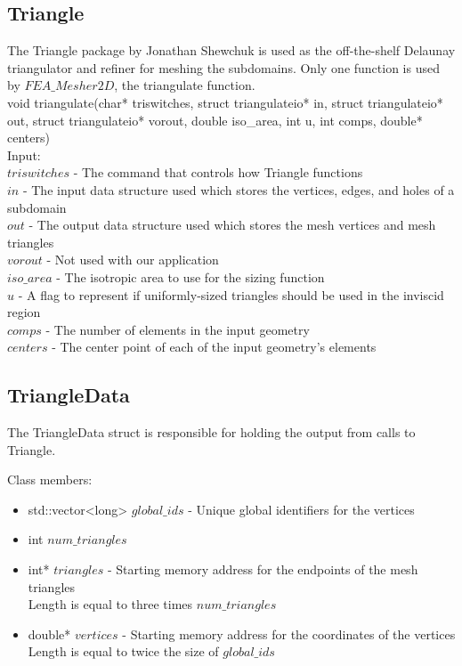 \documentclass[manuscript, screen]{acmart}
\begin{document}
\subsection{Triangle}
The Triangle package by Jonathan Shewchuk is used as the off-the-shelf Delaunay triangulator and refiner for meshing the subdomains. Only one function is used by $FEA\_Mesher2D$, the triangulate function.\\

void triangulate(char* triswitches, struct triangulateio* in, struct triangulateio* out, struct triangulateio* vorout, double iso\_area, int u, int comps, double* centers)\\
Input:\\
$triswitches$ - The command that controls how Triangle functions\\
$in$ - The input data structure used which stores the vertices, edges, and holes of a subdomain\\
$out$ - The output data structure used which stores the mesh vertices and mesh triangles\\
$vorout$ - Not used with our application\\
$iso\_area$ - The isotropic area to use for the sizing function\\
$u$ - A flag to represent if uniformly-sized triangles should be used in the inviscid region\\
$comps$ - The number of elements in the input geometry\\
$centers$ - The center point of each of the input geometry's elements

\subsection{TriangleData}
The TriangleData struct is responsible for holding the output from calls to Triangle.

Class members:
\begin{itemize}
\item std::vector<long> $global\_ids$ - Unique global identifiers for the vertices
\item int $num\_triangles$
\item int* $triangles$ - Starting memory address for the endpoints of the mesh triangles\\
Length is equal to three times $num\_triangles$
\item double* $vertices$ - Starting memory address for the coordinates of the vertices\\
Length is equal to twice the size of $global\_ids$
\end{itemize}
\end{document}
